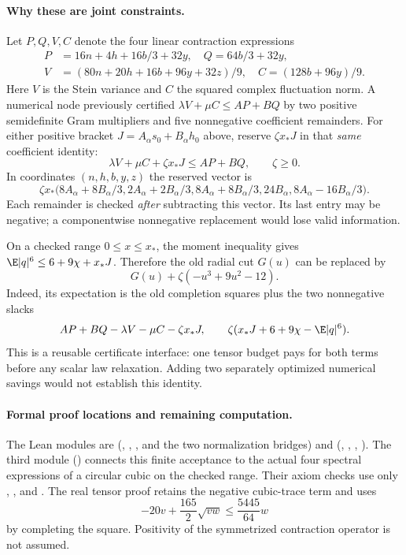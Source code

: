 \paragraph{Why these are joint constraints.}
Let $P,Q,V,C$ denote the four linear contraction expressions
\[
\begin{split}
 P&=16n+4h+16b/3+32y,\quad Q=64b/3+32y,\\
 V&=(80n+20h+16b+96y+32z)/9,\quad C=(128b+96y)/9.
\end{split}
\]
Here $V$ is the Stein variance and $C$ the squared complex fluctuation norm.
A numerical node previously certified $\lambda V+\mu C\le AP+BQ$ by two
positive semidefinite Gram multipliers and five nonnegative coefficient
remainders. For either positive bracket $J=A_\alpha s_0+B_\alpha h_0$ above,
reserve $\zeta x_*J$ in that \emph{same} coefficient identity:
\[
 \lambda V+\mu C+\zeta x_*J\le AP+BQ,\qquad \zeta\ge0.
\]
In coordinates $(n,h,b,y,z)$ the reserved vector is
\[
 \zeta x_*\bigl(8A_\alpha+8B_\alpha/3,
 2A_\alpha+2B_\alpha/3,
 8A_\alpha+8B_\alpha/3,
 24B_\alpha,
 8A_\alpha-16B_\alpha/3\bigr).
\]
Each remainder is checked \emph{after} subtracting this vector. Its last
entry may be negative; a componentwise nonnegative replacement would lose
valid information.

On a checked range $0\le x\le x_*$, the moment inequality gives
$\E|q|^6\le6+9\chi+x_*J$. Therefore the old radial cut $G(u)$ can be
replaced by
\[
 G(u)+\zeta(-u^3+9u^2-12).
\]
Indeed, its expectation is the old completion squares plus the two
nonnegative slacks
\[
 AP+BQ-\lambda V-\mu C-\zeta x_*J,
 \qquad
 \zeta(x_*J+6+9\chi-\E|q|^6).
\]
This is a reusable certificate interface: one tensor budget pays for
both terms before any scalar law relaxation. Adding two separately
optimized numerical savings would not establish this identity.

\paragraph{Formal proof locations and remaining computation.}
The Lean modules are 
(, , , and the two normalization
bridges) and 
(, ,
, ). The third module 
() connects this finite acceptance to the actual four
spectral expressions of a circular cubic on the checked range. Their axiom
checks use only , , and .
The real tensor proof retains the negative cubic-trace term and uses
\[
 -20v+\frac{165}2\sqrt{vw}\le\frac{5445}{64}w
\]
by completing the square. Positivity of the symmetrized contraction
operator is not assumed.

